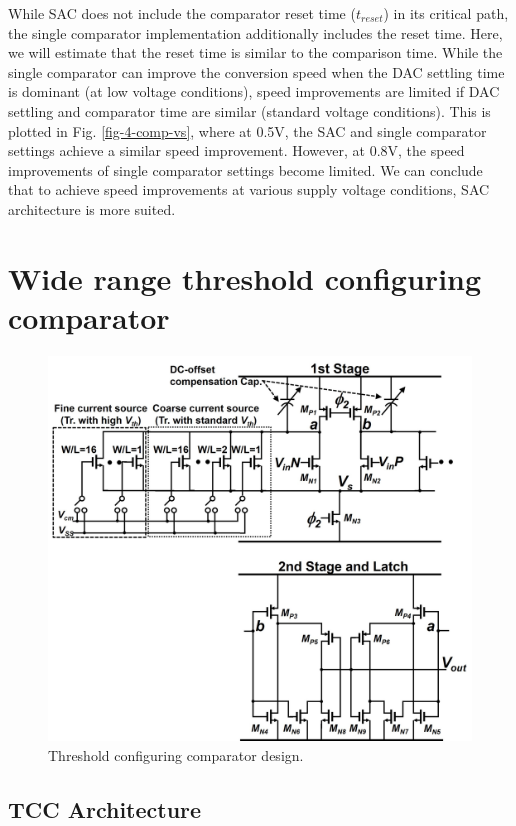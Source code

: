 While SAC does not include the comparator reset time ($t_{reset}$) in its critical path, the single comparator implementation additionally includes the reset time. 
Here, we will estimate that the reset time is similar to the comparison time.
While the single comparator can improve the conversion speed when the DAC settling time is dominant (at low voltage conditions), speed improvements are limited if DAC settling and comparator time are similar (standard voltage conditions). This is plotted in Fig. \ref{fig-4-comp-vs}, where at 0.5V, the SAC and single comparator settings achieve a similar speed improvement. However, at 0.8V, the speed improvements of single comparator settings become limited.
We can conclude that to achieve speed improvements at various supply voltage conditions, SAC architecture is more suited.

\section{Wide range threshold configuring comparator}

\begin{figure}
\centering
  \includegraphics[width=1\textwidth]{figure/chap4/fig5.jpg}
  \caption{Threshold configuring comparator design.}
  \label{fig-4-5}
\end{figure}

\subsection{TCC Architecture}

